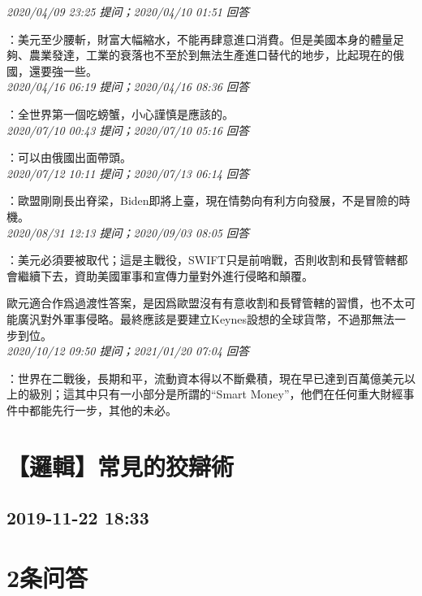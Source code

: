 \documentclass[twocolumn]{ctexart}
\begin{document}
\textit{\hfill\noindent\small 2020/04/09 23:25 提问；2020/04/10 01:51 回答}

：美元至少腰斬，財富大幅縮水，不能再肆意進口消費。但是美國本身的體量足夠、農業發達，工業的衰落也不至於到無法生產進口替代的地步，比起現在的俄國，還要強一些。
\\

\textit{\hfill\noindent\small 2020/04/16 06:19 提问；2020/04/16 08:36 回答}

：全世界第一個吃螃蟹，小心謹慎是應該的。
\\

\textit{\hfill\noindent\small 2020/07/10 00:43 提问；2020/07/10 05:16 回答}

：可以由俄國出面帶頭。
\\

\textit{\hfill\noindent\small 2020/07/12 10:11 提问；2020/07/13 06:14 回答}

：歐盟剛剛長出脊梁，Biden即將上臺，現在情勢向有利方向發展，不是冒險的時機。
\\

\textit{\hfill\noindent\small 2020/08/31 12:13 提问；2020/09/03 08:05 回答}

：美元必須要被取代；這是主戰役，SWIFT只是前哨戰，否則收割和長臂管轄都會繼續下去，資助美國軍事和宣傳力量對外進行侵略和顛覆。

歐元適合作爲過渡性答案，是因爲歐盟沒有有意收割和長臂管轄的習慣，也不太可能廣汎對外軍事侵略。最終應該是要建立Keynes設想的全球貨幣，不過那無法一步到位。
\\

\textit{\hfill\noindent\small 2020/10/12 09:50 提问；2021/01/20 07:04 回答}

：世界在二戰後，長期和平，流動資本得以不斷纍積，現在早已達到百萬億美元以上的級別；這其中只有一小部分是所謂的“Smart Money”，他們在任何重大財經事件中都能先行一步，其他的未必。
\\


\section{【邏輯】常見的狡辯術}
\subsection{2019-11-22 18:33}


\section{2条问答}
\end{document}
